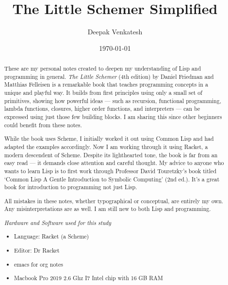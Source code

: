\documentclass[11pt]{article}
\author{Deepak Venkatesh}
\date{\today}
\title{The Little Schemer Simplified}
\begin{document}
\maketitle
\maketitle

\begin{abstract}
These are my personal notes created to deepen my understanding of Lisp and programming in general.
\textit{The Little Schemer} (4th edition) by Daniel Friedman and Matthias Felleisen is a remarkable book
that teaches programming concepts in a unique and playful way. It builds from first principles using only
a small set of primitives, showing how powerful ideas — such as recursion, functional programming, lambda
functions, closures, higher order functions, and interpreters — can be expressed using just those few building
blocks. I am sharing this since other beginners could benefit from these notes.

\bigskip

While the book uses Scheme, I initially worked it out using Common Lisp and had adapted the examples accordingly. Now
I am working through it using Racket, a modern descendent of Scheme. Despite its lighthearted tone, the book is far
from an easy read — it demands close attention and careful thought. My advice to anyone who wants to learn Lisp is to
first work through Professor David Touretzky's book titled `Common Lisp A Gentle Introduction to Symbolic Computing'
(2nd ed.). It's a great book for introduction to programming not just Lisp.

\bigskip

All mistakes in these notes, whether typographical or conceptual, are entirely my own. Any misinterpretations are as
well. I am still new to both Lisp and programming.

\vspace{1em}

\emph{Hardware and Software used for this study}
\begin{itemize}
\item Language: Racket (a Scheme)
\item Editor: Dr Racket
\item emacs for org notes
\item Macbook Pro 2019 2.6 Ghz I7 Intel chip with 16 GB RAM
\end{itemize}
\end{abstract}
\end{document}
